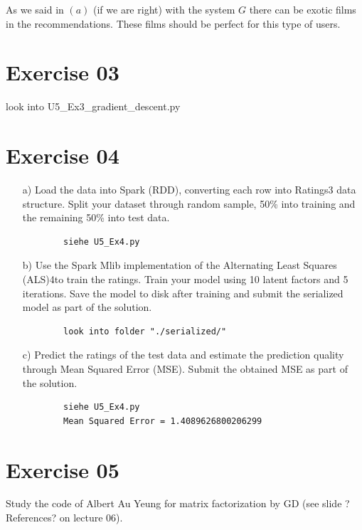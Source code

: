\documentclass[11pt,a4paper]{scrartcl}
\begin{document}
As we said in $(a)$ (if we are right) with the system $G$ there can be exotic films in the recommendations. These films should be perfect for this type of users.

\section*{Exercise 03}
look into U5\_Ex3\_gradient\_descent.py

\section*{Exercise 04}
	\begin{itemize}
	\item [a)] Load the data into Spark (RDD), converting each row into Ratings3 data structure. Split your dataset through random sample, 50\% into training and the remaining 50\% into test data.
	\begin{verbatim}
		siehe U5_Ex4.py
	\end{verbatim}	
	\item [b)] Use the Spark Mlib implementation of the Alternating Least Squares (ALS)4to train the ratings. Train your model using 10 latent factors and 5 iterations. Save the model to disk after training and submit the serialized model as part of the solution.
	\begin{verbatim}
		look into folder "./serialized/"
	\end{verbatim}	
	\item [c)] Predict the ratings of the test data and estimate the prediction quality through Mean Squared Error (MSE). Submit the obtained MSE as part of the solution.
	\begin{verbatim}
		siehe U5_Ex4.py
		Mean Squared Error = 1.4089626800206299
	\end{verbatim}	
\end{itemize}

\section*{Exercise 05}
Study the code of Albert Au Yeung for matrix factorization by GD (see slide ?References? on lecture 06).
\end{document}
